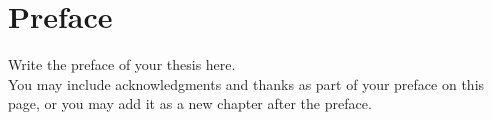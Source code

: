 \chapter*{Preface}

Write the preface of your thesis here. \\

\noindent You may include acknowledgments and thanks as part of your preface on this page, or you may add it as a new chapter after the preface.